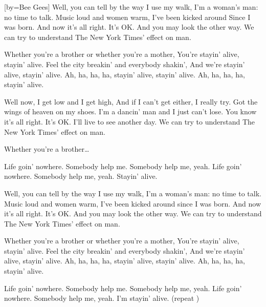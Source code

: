 [by={Bee Gees}]
\beginverse
Well, you can tell by the way I use my walk,
I'm a woman's man: no time to talk.
Music loud and women warm, I've been kicked around
Since I was born.
And now it's all right. It's OK.
And you may look the other way.
We can try to understand
The New York Times' effect on man.
\endverse

\beginchorus
Whether you're a brother or whether you're a mother,
You're stayin' alive, stayin' alive.
Feel the city breakin' and everybody shakin',
And we're stayin' alive, stayin' alive.
Ah, ha, ha, ha, stayin' alive, stayin' alive.
Ah, ha, ha, ha, stayin' alive.
\endchorus

\beginverse
Well now, I get low and I get high,
And if I can't get either, I really try.
Got the wings of heaven on my shoes.
I'm a dancin' man and I just can't lose.
You know it's all right. It's OK.
I'll live to see another day.
We can try to understand
The New York Times' effect on man.
\endverse

\beginchorus
Whether you're a brother\dots
\endchorus

\beginverse
Life goin' nowhere. Somebody help me.
Somebody help me, yeah.
Life goin' nowhere. Somebody help me, yeah.
Stayin' alive.
\endverse

\beginverse
Well, you can tell by the way I use my walk,
I'm a woman's man: no time to talk.
Music loud and women warm,
I've been kicked around since I was born.
And now it's all right. It's OK.
And you may look the other way.
We can try to understand
The New York Times' effect on man.
\endverse

\beginverse
Whether you're a brother or whether you're a mother,
You're stayin' alive, stayin' alive.
Feel the city breakin' and everybody shakin',
And we're stayin' alive, stayin' alive.
Ah, ha, ha, ha, stayin' alive, stayin' alive.
Ah, ha, ha, ha, stayin' alive.
\endverse

\beginchorus
Life goin' nowhere. Somebody help me.
Somebody help me, yeah.
Life goin' nowhere. Somebody help me, yeah.
I'm stayin' alive. 
(repeat )
\endchorus
\endsong